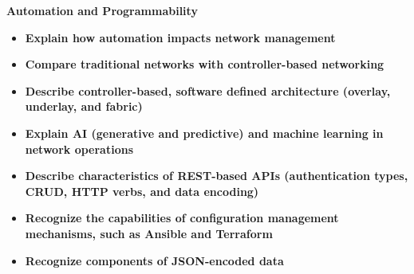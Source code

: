\documentclass{article}
\begin{document}
\begin{flushleft}\textbf{Automation and Programmability}\end{flushleft}
\begin{itemize}
  \item \textbf{Explain how automation impacts network management}
  \item \textbf{Compare traditional networks with controller-based networking}
  \item \textbf{Describe controller-based, software defined architecture (overlay, underlay, and fabric)} 
  \item \textbf{Explain AI (generative and predictive) and machine learning in network operations}
  \item \textbf{Describe characteristics of REST-based APIs (authentication types, CRUD, HTTP verbs, and data encoding)}
  \item \textbf{Recognize the capabilities of configuration management mechanisms, such as Ansible and Terraform}
  \item \textbf{Recognize components of JSON-encoded data}
\end{itemize}
\end{document}
